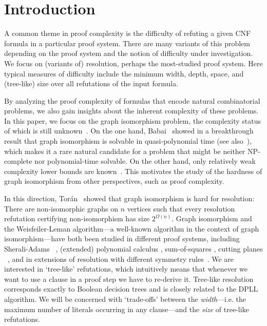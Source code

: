 \documentclass[10pt,a4paper]{article}
\begin{document}
        \section{Introduction}\label{sec:introduction}
        
        
%


A common theme in proof complexity is the difficulty of refuting a given CNF formula in a particular proof system.
There are many variants of this problem depending on the proof system and the notion of difficulty under investigation. We focus on (variants of) resolution,  perhaps the most-studied proof system. Here typical measures of difficulty include the minimum width, depth, space, and (tree-like) size over all refutations of the input formula. 

By analyzing the proof complexity of formulas that encode natural
combinatorial problems, we also gain insights about the inherent complexity of
these problems. In this paper, we focus on the graph isomorphism problem, the 
complexity status of which is still unknown~\cite{DBLP:conf/coco/Karp72}.
On the one hand, Babai~\cite{Babai2016} showed in a breakthrough result that graph isomorphism is solvable in quasi-polynomial time (see also~\cite{DBLP:conf/bcc/GroheN21}),
which makes it a rare natural candidate for a problem that might be neither NP-complete nor polynomial-time solvable.
On the other hand, only relatively weak complexity lower bounds are known~\cite{Toran04}.
This motivates the study of the hardness of graph isomorphism from other perspectives, such as proof complexity.

In this direction,
Torán~\cite{DBLP:conf/sat/Toran13} showed that graph isomorphism is hard for resolution:
There are non-isomorphic graphs on $n$ vertices such that every resolution refutation certifying non-isomorphism has size
$2^{\Omega(n)}$.
Graph isomorphism and the Weisfeiler-Leman algorithm---a well-known algorithm in the context of graph isomorphism---have both  been studied in different proof systems, including
 Sherali-Adams%
~\cite{DBLP:journals/siamcomp/AtseriasM13,
        DBLP:journals/jsyml/GroheO15},
(extended) polynomial
calculus
\cite{DBLP:conf/icalp/BerkholzG15,DBLP:conf/soda/BerkholzG17, Pago2023},
sum-of-squares %
\cite{DBLP:conf/soda/ODonnellWWZ14},
cutting planes%
~\cite{DBLP:conf/sat/ToranW23},
and in extensions of resolution with different symmetry rules~\cite{SchweitzerSeebach21, DBLP:conf/sat/ToranW23}.
%
We are interested in `tree-like' refutations, which intuitively means
that whenever we want to use a clause in a proof step we have to
re-derive it. Tree-like resolution corresponds exactly to Boolean
decision trees and is closely related to the DPLL
algorithm. We will be concerned with `trade-offs' between the \emph{width}---i.e. the maximum number of literals occurring in any clause---and the \emph{size} of tree-like refutations. 
\end{document}
